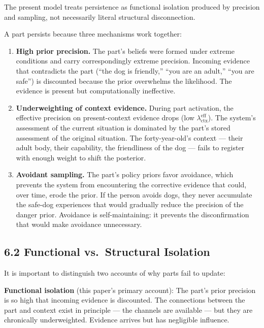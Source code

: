\documentclass[11pt]{article}
\begin{document}
The present model treats persistence as functional isolation produced by
precision and sampling, not necessarily literal structural
disconnection.

A part persists because three mechanisms work together:

\begin{enumerate}
\def\labelenumi{\arabic{enumi}.}
\item
  \textbf{High prior precision.} The part's beliefs were formed under
  extreme conditions and carry correspondingly extreme precision.
  Incoming evidence that contradicts the part (``the dog is friendly,''
  ``you are an adult,'' ``you are safe'') is discounted because the
  prior overwhelms the likelihood. The evidence is present but
  computationally ineffective.
\item
  \textbf{Underweighting of context evidence.} During part activation,
  the effective precision on present-context evidence drops (low
  \(\lambda_{\text{ctx}}^{\text{eff}}\)). The system's assessment of the
  current situation is dominated by the part's stored assessment of the
  original situation. The forty-year-old's context --- their adult body,
  their capability, the friendliness of the dog --- fails to register
  with enough weight to shift the posterior.
\item
  \textbf{Avoidant sampling.} The part's policy priors favor avoidance,
  which prevents the system from encountering the corrective evidence
  that could, over time, erode the prior. If the person avoids dogs,
  they never accumulate the safe-dog experiences that would gradually
  reduce the precision of the danger prior. Avoidance is
  self-maintaining: it prevents the disconfirmation that would make
  avoidance unnecessary.
\end{enumerate}

\subsection{6.2 Functional vs.~Structural
Isolation}\label{functional-vs.-structural-isolation}

It is important to distinguish two accounts of why parts fail to update:

\textbf{Functional isolation} (this paper's primary account): The part's
prior precision is so high that incoming evidence is discounted. The
connections between the part and context exist in principle --- the
channels are available --- but they are chronically underweighted.
Evidence arrives but has negligible influence.
\end{document}
